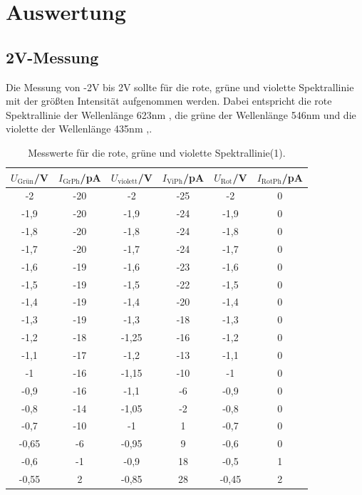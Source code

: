 \section{Auswertung}
\label{sec:Auswertung}
\subsection{2V-Messung}
Die Messung von -2V bis 2V sollte für die rote, grüne und violette Spektrallinie mit der größten Intensität
aufgenommen werden. Dabei entspricht die rote Spektrallinie der Wellenlänge 623nm , die grüne der Wellenlänge 546nm und
die violette der Wellenlänge 435nm \cite{sample},\cite{Spektrum}.
\begin{table}[H]
  \centering
  \caption{Messwerte für die rote, grüne und violette Spektrallinie(1).}
  \label{tab:2VMesswerte(1)}
  \begin{tabular}{S[table-format=1.2] S[table-format=3] S[table-format=1.2] S[table-format=4]S[table-format=1.2]S[table-format=2]}
      \toprule
      {$U_\text{Grün}$/V}&{$I_\text{GrPh}$/pA}&{$U_\text{violett}$/V}&{$I_\text{ViPh}$/pA}&{$U_\text{Rot}$/V}&{$I_\text{RotPh}$/pA}\\
       & -20 & -2 & -25 & -2 & 0 \\
      -1,9 & -20 & -1,9 & -24 & -1,9 & 0 \\
      -1,8 & -20 & -1,8 & -24 & -1,8 & 0 \\
      -1,7 & -20 & -1,7 & -24 & -1,7 & 0 \\
      -1,6 & -19 & -1,6 & -23 & -1,6 & 0 \\
      -1,5 & -19 & -1,5 & -22 & -1,5 & 0 \\
      -1,4 & -19 & -1,4 & -20 & -1,4 & 0 \\
      -1,3 & -19 & -1,3 & -18 & -1,3 & 0 \\
      -1,2 & -18 & -1,25 & -16 & -1,2 & 0 \\
      -1,1 & -17 & -1,2 & -13 & -1,1 & 0 \\
      -1 & -16 & -1,15 & -10 & -1 & 0 \\
      -0,9 & -16 & -1,1 & -6 & -0,9 & 0 \\
      -0,8 & -14 & -1,05 & -2 & -0,8 & 0 \\
      -0,7 & -10 & -1 & 1 & -0,7 & 0 \\
      -0,65 & -6 & -0,95 & 9 & -0,6 & 0 \\
      -0,6 & -1 & -0,9 & 18 & -0,5 & 1 \\
      -0,55 & 2 & -0,85 & 28 & -0,45 & 2 \\

\end{tabular}
\end{table}
